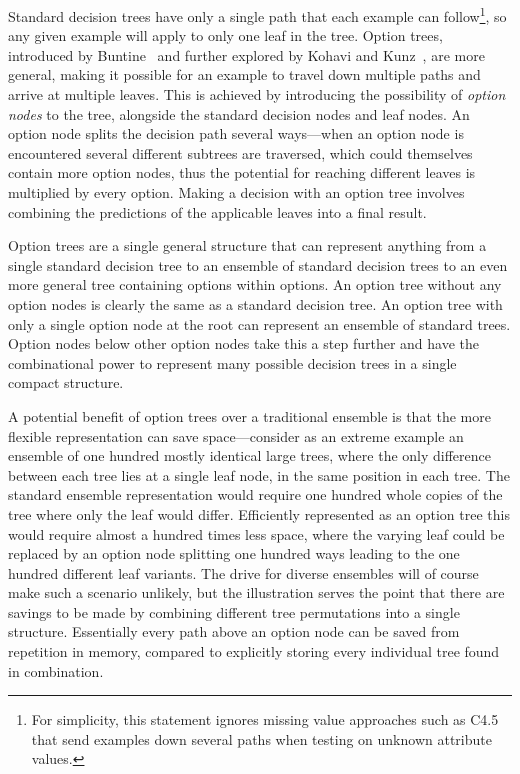 Standard decision trees have only a single path that each example can follow\footnote{For simplicity, this statement ignores missing value approaches such as C4.5 that send examples down several paths when testing on unknown attribute values.}, so any given example will apply to only one leaf in the tree. Option trees, introduced by Buntine~\cite{buntinetrees} and further explored by Kohavi and Kunz~\cite{kohaviot}, are more general, making it possible for an example to travel down multiple paths and arrive at multiple leaves. This is achieved by introducing the possibility of {\em option nodes} to the tree, alongside the standard decision nodes and leaf nodes. An option node splits the decision path several ways---when an option node is encountered several different subtrees are traversed, which could themselves contain more option nodes, thus the potential for reaching different leaves is multiplied by every option. Making a decision with an option tree involves combining the predictions of the applicable leaves into a final result.

Option trees are a single general structure that can represent anything from a single standard decision tree to an ensemble of standard decision trees to an even more general tree containing options within options. An option tree without any option nodes is clearly the same as a standard decision tree. An option tree with only a single option node at the root can represent an ensemble of standard trees. Option nodes below other option nodes take this a step further and have the combinational power to represent many possible decision trees in a single compact structure.

A potential benefit of option trees over a traditional ensemble is that the more flexible representation can save space---consider as an extreme example an ensemble of one hundred mostly identical large trees, where the only difference between each tree lies at a single leaf node, in the same position in each tree. The standard ensemble representation would require one hundred whole copies of the tree where only the leaf would differ. Efficiently represented as an option tree this would require almost a hundred times less space, where the varying leaf could be replaced by an option node splitting one hundred ways leading to the one hundred different leaf variants. The drive for diverse ensembles will of course make such a scenario unlikely, but the illustration serves the point that there are savings to be made by combining different tree permutations into a single structure. Essentially every path above an option node can be saved from repetition in memory, compared to explicitly storing every individual tree found in combination.


